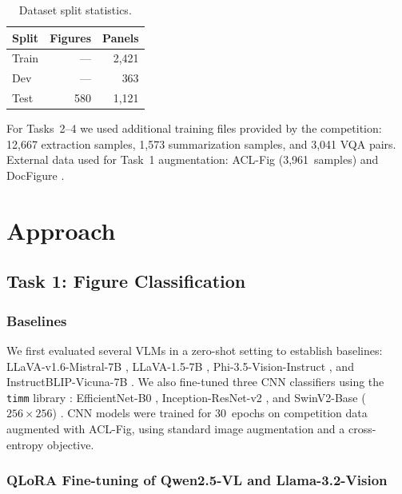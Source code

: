 \documentclass[11pt]{tibop-article}
\begin{document}
\begin{table}[h!]
  \caption{Dataset split statistics.}\label{tab:data}
  \begin{tabularx}{\linewidth}{lrr}
    \toprule
    \textbf{Split} & \textbf{Figures} & \textbf{Panels} \\
    \midrule
    Train          & ---  & 2,421 \\
    Dev            & ---  & 363   \\
    Test           & 580  & 1,121 \\
    \bottomrule
  \end{tabularx}
\end{table}

For Tasks~2--4 we used additional training files provided by the competition:
12,667 extraction samples, 1,573 summarization samples, and 3,041 VQA pairs.
External data used for Task~1 augmentation: ACL-Fig \cite{aclfig} (3,961~samples)
and DocFigure \cite{docfigure}.


\section{Approach}

\subsection{Task 1: Figure Classification}
\label{sec:task1}

\subsubsection{Baselines}

We first evaluated several VLMs in a zero-shot setting to establish baselines:
LLaVA-v1.6-Mistral-7B \cite{llava16}, LLaVA-1.5-7B \cite{llava15},
Phi-3.5-Vision-Instruct \cite{phi35vision}, and InstructBLIP-Vicuna-7B
\cite{instructblip}.
We also fine-tuned three CNN classifiers using the \texttt{timm} library
\cite{timm}: EfficientNet-B0 \cite{efficientnet}, Inception-ResNet-v2
\cite{inceptionresnet}, and SwinV2-Base ($256\times256$) \cite{swinv2}.
CNN models were trained for 30~epochs on competition data augmented with
ACL-Fig, using standard image augmentation and a cross-entropy objective.

\subsubsection{QLoRA Fine-tuning of Qwen2.5-VL and Llama-3.2-Vision}
\end{document}
